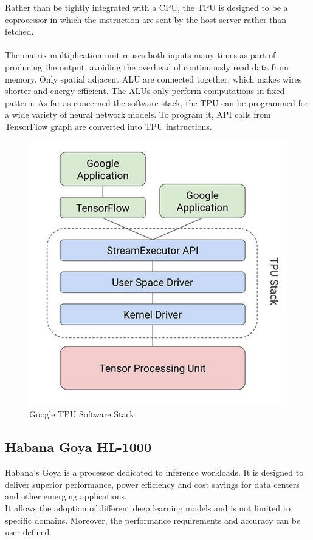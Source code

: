 Rather than be tightly integrated with a CPU, the TPU is designed to be a coprocessor in which the instruction are sent by the host server rather than fetched.\\\\
The matrix multiplication unit reuses both inputs many times as part of producing the output, avoiding the overhead of continuously read data from memory. Only spatial adjacent ALU are connected together, which makes wires shorter and energy-efficient. The ALUs only perform computations in fixed pattern.
\newpage
As far as concerned the software stack, the TPU can be programmed for a wide variety of neural network models. To program it, API calls from TensorFlow graph are converted into TPU instructions.
\begin{figure}[H]
\centering
\captionsetup{justification=centering}
\includegraphics[scale=0.4]{./figure/tpu_sw_stack.PNG}
\caption{Google TPU Software Stack \cite{WEBSITE:9}}
\label{fig:gtpuswstack}
\end{figure}

\subsection{Habana Goya HL-1000}

Habana’s Goya is a processor dedicated to inference workloads. It is designed to deliver superior performance, power efficiency and cost savings for data centers and other emerging applications.\\
It allows the adoption of different deep learning models and is not limited to specific domains. Moreover, the performance requirements and accuracy can be user-defined.\\


